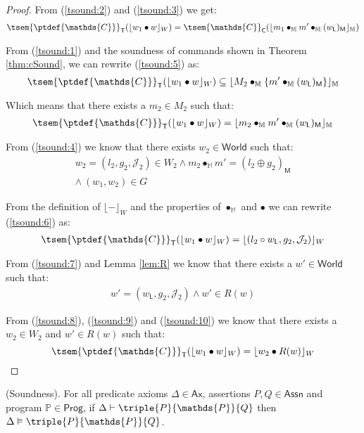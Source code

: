 \begin{thm}
{\begin{proof}
	From (\ref{tsound:2}) and (\ref{tsound:3}) we get:
	\begin{gather}\label{tsound:5}
	\tsem{\ptdef{\mathds{C}}}_\mathsf{T}(\lfloor w_1 \bullet w \rfloor_W) =
	\tsem{\mathds{C}}_\mathsf{C}(\lfloor m_1 \bullet_\mathbb{M} m' \bullet_\mathbb{M} (w_\mathsf{L})_\mathsf{M} \rfloor_\mathbb{M})
	\end{gather}
	
	From (\ref{tsound:1}) and the soundness of commands shown in Theorem \ref{thm:cSound}, we can rewrite (\ref{tsound:5}) as:
	\[
		\tsem{\ptdef{\mathds{C}}}_\mathsf{T}(\lfloor w_1 \bullet w \rfloor_W)
		\subseteq
		\lfloor M_2 \bullet_\mathbb{M} \{m' \bullet_\mathbb{M} (w_\mathsf{L})_\mathsf{M}\} \rfloor_\mathbb{M}
	\]
	
	Which means that there exists a $m_2 \in M_2$ such that:
	\begin{gather}\label{tsound:6}
		\tsem{\ptdef{\mathds{C}}}_\mathsf{T}(\lfloor w_1 \bullet w \rfloor_W)
		=
		\lfloor m_2 \bullet_\mathbb{M} m' \bullet_\mathbb{M} (w_\mathsf{L})_\mathsf{M} \rfloor_\mathbb{M}
	\end{gather}
	
	From (\ref{tsound:4}) we know that there exists $w_2 \in \mathsf{World}$ such that:
	\begin{gather}
	\label{tsound:8} w_2 = (l_2, g_2, \mathcal{J}_2) \in W_2 \land m_2 \bullet_\mathbb{M} m' = (l_2 \oplus g_2)_\mathsf{M} \\
	\label{tsound:7} \land\ (w_1, w_2) \in G
	\end{gather}
	
	From the definition of $\lfloor - \rfloor_W$ and the properties of $\bullet_\mathbb{M}$ and $\bullet$ we can rewrite (\ref{tsound:6}) as:
	\begin{gather}\label{tsound:9}
		\tsem{\ptdef{\mathds{C}}}_\mathsf{T}(\lfloor w_1 \bullet w \rfloor_W)
		=
		\lfloor (l_2 \circ w_\mathsf{L}, g_2, \mathcal{J}_2) \rfloor_W
	\end{gather}
	
	From (\ref{tsound:7}) and Lemma \ref{lem:R} we know that there exists a $w' \in \mathsf{World}$ such that:
	\begin{gather}\label{tsound:10}
		w' = (w_\mathsf{L}, g_2, \mathcal{J}_2) \land w' \in R(w)
	\end{gather}
	
	From (\ref{tsound:8}), (\ref{tsound:9}) and (\ref{tsound:10}) we know that there exists a $w_2 \in W_2$ and $w' \in R(w)$ such that:
	\[
		\tsem{\ptdef{\mathds{C}}}_\mathsf{T}(\lfloor w_1 \bullet w \rfloor_W) = \lfloor w_2 \bullet R(w) \rfloor_W
	\]
	\end{proof}
	}
\end{thm}

\begin{thm}
	\label{thm:mcapSound}
	(Soundness).
	For all predicate axioms $\Delta \in \mathsf{Ax}$, assertions $P, Q \in \mathsf{Assn}$ and program $\mathds{P} \in \mathsf{Prog}$, if $\Delta \vdash \triple{P}{\mathds{P}}{Q}$ then $\Delta \vDash \triple{P}{\mathds{P}}{Q}$.
\end{thm}